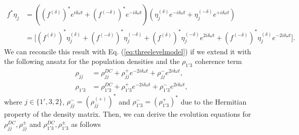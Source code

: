 \documentclass[]{spie}  %
\begin{document}
 	\begin{align}
 	\label{eq:feta-product}
 	f^{*}\eta_{j} &= ((f^{(\delta)})^*e^{  i\delta\omega t} + (f^{(-\delta)})^*e^{-i\delta\omega t})(\eta_{j}^{(\delta)}e^{ - i\delta\omega t} + \eta_{j}^{(-\delta)}e^{+i\delta\omega t}) \nonumber \\
 	&= \big[ (f^{(\delta)})^*\eta_{j}^{(\delta)} +(f^{(-\delta)})^*\eta_{j}^{(-\delta)} + (f^{(\delta)})^*\eta_{j}^{(-\delta)}e^{2i\delta\omega t} + (f^{(-\delta)})^*\eta_{j}^{(\delta)}e^{-2i\delta\omega t}\big ].
 	\end{align} 
 We can reconcile this result with Eq. (\ref{eq:threelevelmodel}) if we extend it with the following ansatz for the  population densities and the $\rho_{1'3}$ coherence term 
 \begin{align}
 \rho_{jj} &= \rho_{jj}^{DC}+\rho_{jj}^{+}e^{-2i\delta \omega t} + \rho_{jj}^{-}e^{2i\delta \omega t}, \\
 \rho_{1'3} &= \rho_{1'3}^{DC}+\rho_{1'3}^{+}e^{-2i\delta \omega t} + \rho_{1'3}^{-}e^{2i\delta \omega t},
 \end{align}
 where $j \in \{1',3,2\}$, $\rho_{jj}^{-} = (\rho_{jj}^{(+)})^*$ and $\rho_{1'3}^{-} = (\rho_{1'3}^{+})^*$ due to the Hermitian property of the density matrix. Then, we can derive the evolution equations for $\rho_{jj}^{DC},\rho_{jj}^{\pm}$ and $\rho_{1'3}^{DC},\rho_{1'3}^{\pm}$ as follows
\end{document}
